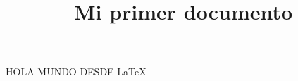 \documentclass[10pt,a4paper]{report}
\title{Mi primer documento}
\begin{document}
  \maketitle
  HOLA MUNDO DESDE \LaTeX
\end{document}

